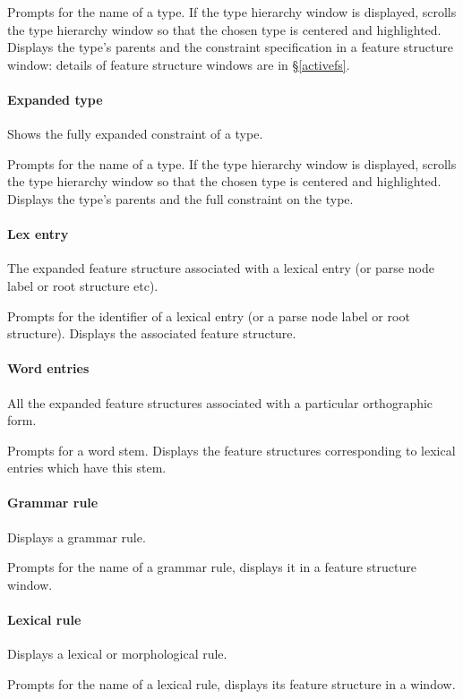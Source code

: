\documentclass[12pt]{report}
\begin{document}
Prompts for the name of a type. 
If the type hierarchy window is displayed, scrolls the
type hierarchy window so that the chosen type is centered and
highlighted.  
Displays the type's
parents and the constraint specification in a feature
structure window:
details of feature structure windows are in \S\ref{activefs}.


\paragraph{Expanded type}
\label{type-exp}
Shows the fully expanded constraint of a type.

Prompts for the name of a type. 
If the type hierarchy window is displayed, scrolls the
type hierarchy window so that the chosen type is centered and
highlighted.  
Displays the type's
parents and the full constraint on the type.

\paragraph{Lex entry}
\label{psort-exp}
The expanded feature structure associated with a lexical entry
(or parse node label or root structure etc).

Prompts for the identifier of a lexical entry (or a parse node
label or root structure).
Displays the associated feature structure.

\paragraph{Word entries}
All the expanded feature structures associated with a particular
orthographic form.

Prompts for a word stem.
Displays the feature structures corresponding to lexical entries
which have this stem.

\paragraph{Grammar rule}
Displays a grammar rule.

Prompts for the name of a grammar rule, displays it in a
feature structure window.

\paragraph{Lexical rule}
Displays a lexical or morphological rule.

Prompts for the name of a lexical rule, displays its feature structure in a
window.
\end{document}
